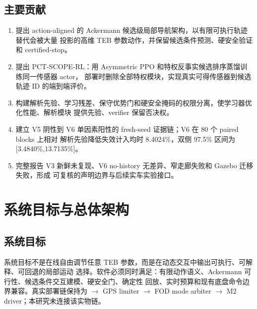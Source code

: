 \documentclass[12pt,a4paper,oneside]{report}
\begin{document}
\section{主要贡献}
\begin{enumerate}
  \item 提出 action-aligned 的 Ackermann 候选级局部导航架构，以有限可执行轨迹替代会被大量
  投影的高维 TEB 参数动作，并保留候选条件预测、硬安全验证和 certified-stop。
  \item 提出 PCT-SCOPE-RL：用 Asymmetric PPO 和特权反事实候选排序蒸馏训练同一传感器 actor，
  部署时删除全部特权模块，实现真实可得传感器到候选轨迹 ID 的端到端评价。
  \item 构建解析先验、学习残差、保守优势门和硬安全掩码的权限分离，使学习器优化性能、解析模块
  提供先验、verifier 保留否决权。
  \item 建立 V5 阴性到 V6 单因素阳性的 fresh-seed 证据链；V6 在 80 个 paired blocks 上相对
  解析先验降低失效计入均时 8.4024\%，双侧 97.5\% 区间为 [3.4840\%,13.7135\%]。
  \item 完整报告 V3 新鲜未复现、V6 no-history 无差异、窄走廊失败和 Gazebo 迁移失败，形成
  可复核的声明边界与后续实车实验接口。
\end{enumerate}

\chapter{系统目标与总体架构}
\section{系统目标}
系统目标不是在线自由调节任意 TEB 参数，而是在动态交互中输出可执行、可解释、可回退的局部运动
选择。软件必须同时满足：有限动作语义、Ackermann 可行性、候选条件交互建模、硬安全门、确定性
回放、实时预算和现有底盘命令边界兼容。真实部署链保持为
 $\rightarrow$ GPS limiter $\rightarrow$ FOD mode arbiter
$\rightarrow$ M2 driver；本研究未连接该实物链。
\end{document}

